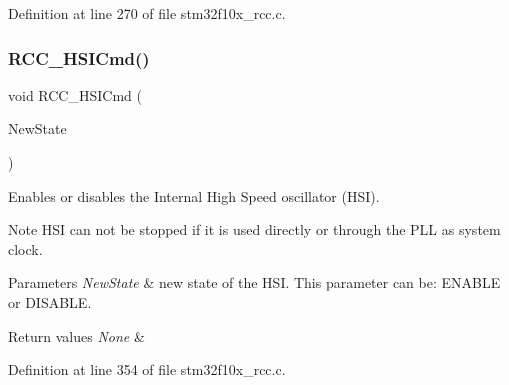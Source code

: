 Definition at line 270 of file stm32f10x\+\_\+rcc.\+c.

\mbox{\label{group___r_c_c___exported___functions_ga0c6772a1e43765909495f57815ef69e2}} 
\subsubsection{\texorpdfstring{R\+C\+C\+\_\+\+H\+S\+I\+Cmd()}{RCC\_HSICmd()}}
{\footnotesize\ttfamily void R\+C\+C\+\_\+\+H\+S\+I\+Cmd (\begin{DoxyParamCaption}\item[{\hyperlink{group___exported__types_gac9a7e9a35d2513ec15c3b537aaa4fba1}{Functional\+State}}]{New\+State }\end{DoxyParamCaption})}



Enables or disables the Internal High Speed oscillator (H\+SI). 

\begin{DoxyNote}{Note}
H\+SI can not be stopped if it is used directly or through the P\+LL as system clock. 
\end{DoxyNote}

\begin{DoxyParams}{Parameters}
{\em New\+State} & new state of the H\+SI. This parameter can be\+: E\+N\+A\+B\+LE or D\+I\+S\+A\+B\+LE. \\
\hline
\end{DoxyParams}

\begin{DoxyRetVals}{Return values}
{\em None} & \\
\hline
\end{DoxyRetVals}


Definition at line 354 of file stm32f10x\+\_\+rcc.\+c.

\mbox{\label{group___r_c_c___exported___functions_gaa953aa226e9ce45300d535941e4dfe2f}} 
